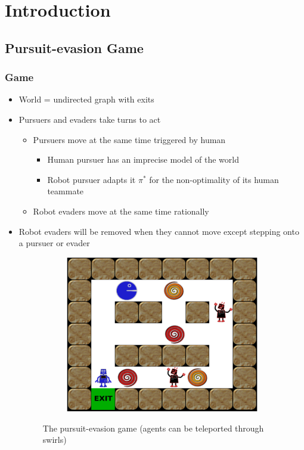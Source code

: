 \section{Introduction}
\subsection{Pursuit-evasion Game}
\subsubsection{Game}
\begin{itemize}
    \item World = undirected graph with exits
    \item Pursuers and evaders take turns to act
    \begin{itemize}
        \item Pursuers move at the same time triggered by human
        \begin{itemize}
            \item Human pursuer has an imprecise model of the world
            \item Robot pursuer adapts it $\pi^*$ for the non-optimality of its human teammate
        \end{itemize}
        \item Robot evaders move at the same time rationally
    \end{itemize}
    \item Robot evaders will be removed when they cannot move except stepping onto a pursuer or evader
        \begin{figure}[ht]
            \centering
            \begin{subfigure}[b]{.5\linewidth}
            \includegraphics[width=\linewidth]{./game.png}
            \caption{}
            \end{subfigure}
            \caption{The pursuit-evasion game (agents can be teleported through swirls)}
            \label{fig:game}
        \end{figure}
\end{itemize}

